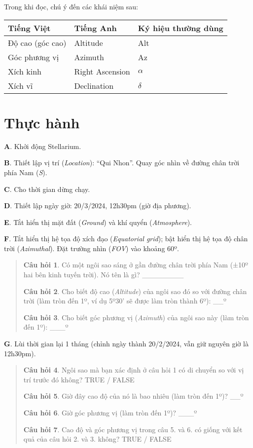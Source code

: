 \documentclass[
  a4paper,
]{book}
\begin{document}
Trong khi đọc, chú ý đến các khái niệm sau:

\begin{longtable}[]{@{}lll@{}}
\toprule\noalign{}
Tiếng Việt & Tiếng Anh & Ký hiệu thường dùng \\
\midrule\noalign{}
\endhead
\bottomrule\noalign{}
\endlastfoot
Độ cao (góc cao) & Altitude & Alt \\
Góc phương vị & Azimuth & Az \\
Xích kinh & Right Ascension & \(\alpha\) \\
Xích vĩ & Declination & \(\delta\) \\
\end{longtable}

\section{Thực hành}\label{thux1ef1c-huxe0nh}

\textbf{A}. Khởi động Stellarium.

\textbf{B}. Thiết lập vị trí (\emph{Location}): ``Qui Nhon''. Quay góc nhìn về đường chân trời phía Nam (\emph{S}).

\textbf{C}. Cho thời gian dừng chạy.

\textbf{D}. Thiết lập ngày giờ: 20/3/2024, 12h30pm (giờ địa phương).

\textbf{E}. Tắt hiển thị mặt đất (\emph{Ground}) và khí quyển (\emph{Atmosphere}).

\textbf{F}. Tắt hiển thị hệ tọa độ xích đạo (\emph{Equatorial grid}); bật hiển thị hệ tọa độ chân trời (\emph{Azimuthal}). Đặt trường nhìn (\emph{FOV}) vào khoảng 60º.

\begin{quote}
\textbf{Câu hỏi 1}. Có một ngôi sao sáng ở gần đường chân trời phía Nam (±10º hai bên kinh tuyến trời). Nó tên là gì?
\_\_\_\_\_\_\_\_

\textbf{Câu hỏi 2}. Cho biết độ cao (\emph{Altitude}) của ngôi sao đó so với đường chân trời (làm tròn đến 1º, ví dụ 5º30' sẽ được làm tròn thành 6º):
\_\_º

\textbf{Câu hỏi 3}. Cho biết góc phương vị (\emph{Azimuth}) của ngôi sao này (làm tròn đến 1º):
\_\_\_º
\end{quote}

\textbf{G}. Lùi thời gian lại 1 tháng (chỉnh ngày thành 20/2/2024, vẫn giữ nguyên giờ là 12h30pm).

\begin{quote}
\textbf{Câu hỏi 4}. Ngôi sao mà bạn xác định ở câu hỏi 1 có di chuyển so với vị trí trước đó không?
TRUE / FALSE

\textbf{Câu hỏi 5}. Giờ đây cao độ của nó là bao nhiêu (làm tròn đến 1º)?
\_\_º

\textbf{Câu hỏi 6}. Giờ góc phương vị (làm tròn đến 1º)?
\_\_\_º

\textbf{Câu hỏi 7}. Cao độ và góc phương vị trong câu 5. và 6. có giống với kết quả của câu hỏi 2. và 3. không?
TRUE / FALSE
\end{quote}
\end{document}
